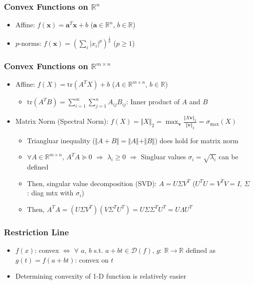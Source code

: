\subsubsection*{Convex Functions on $\mathbb{R}^n$}
\begin{itemize}
    \item Affine: $f(\mathbf{x}) = \mathbf{a}^T\mathbf{x} + b$ ($\mathbf{a} \in \mathbb{R}^n$, $b\in\mathbb{R}$)
    \item $p$-norms: $f(\mathbf{x}) = \left(\sum_i |x_i|^p\right)^{\frac 1 p}$ ($p \geq 1$)
\end{itemize}

\subsubsection*{Convex Functions on $\mathbb{R}^{m\times n}$}
\begin{itemize}
    \item Affine: $f(X) = \mathrm{tr}(A^T X) + b$ ($A \in \mathbb{R}^{m \times n}$, $b \in \mathbb{R}$)
    \begin{itemize}
        \item $\mathrm{tr}(A^T B) = \sum_{i=1}^m \sum_{j=1}^n A_{ij} B_{ij}$: Inner product of $A$ and $B$
    \end{itemize}
    \item Matrix Norm (Spectral Norm): $f(X) = \Vert X \Vert_2 = \max_{\mathbf{v}} \frac {\Vert X\mathbf{v} \Vert_2} {\Vert \mathbf{v} \Vert_2} = \sigma_{\max}(X)$
    \begin{itemize}
        \item Triangluar inequality ($\Vert A+B \Vert = \Vert A \Vert + \Vert B \Vert$) does hold for matrix norm
        \item $\forall A \in \mathbb{R}^{m\times n}$, $A^T A \succeq 0$ $\Rightarrow$ $\lambda_i \geq 0$ $\Rightarrow$ Singluar values $\sigma_i = \sqrt{\lambda_i}$ can be defined
        \item Then, singular value decomposition (SVD): $A = U\Sigma V^T$ ($U^TU = V^TV = I$, $\Sigma$: diag mtx with $\sigma_i$)
        \item Then, $A^T A = \left( U\Sigma V^T \right) \left(V \Sigma^T U^T \right) = U\Sigma \Sigma^T U^T = U \Lambda U^T$
    \end{itemize}
\end{itemize}

\subsubsection*{Restriction Line}
\begin{itemize}
    \item $f(x)$: convex $\Leftrightarrow$ $\forall$ $a$, $b$ s.t. $a + bt \in \mathcal{D}(f)$, $g:~\mathbb{R} \rightarrow \mathbb{R}$ defined as $g(t) = f(a + bt)$: convex on $t$
    \item Determining convexity of 1-D function is relatively easier
\end{itemize}

